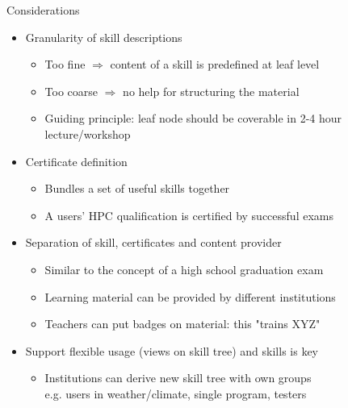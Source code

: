 \documentclass[compress,aspectratio=169]{beamer}
\begin{document}
\begin{frame}{Considerations}
	\begin{itemize}
		\item Granularity of skill descriptions
		\begin{itemize}
			\item Too fine $\Rightarrow$ content of a skill is predefined at leaf level
			\item Too coarse $\Rightarrow$ no help for structuring the material
			\item Guiding principle: leaf node should be coverable in 2-4 hour lecture/workshop
		\end{itemize}

		\item Certificate definition
		\begin{itemize}
			\item Bundles a set of useful skills together %
			\item A users' HPC qualification is certified by successful exams
		\end{itemize}
		\item Separation of skill, certificates and content provider
		\begin{itemize}
			\item Similar to the concept of a high school graduation exam %
			\item Learning material can be provided by different institutions
			\item Teachers can put badges on material: this "trains XYZ"
		\end{itemize}
		\item Support flexible usage (views on skill tree) and skills is key
		\begin{itemize}
			\item Institutions can derive new skill tree with own groups \\
			e.g. users in weather/climate, single program, testers
			\end{itemize}
	\end{itemize}
\end{frame}
\end{document}
